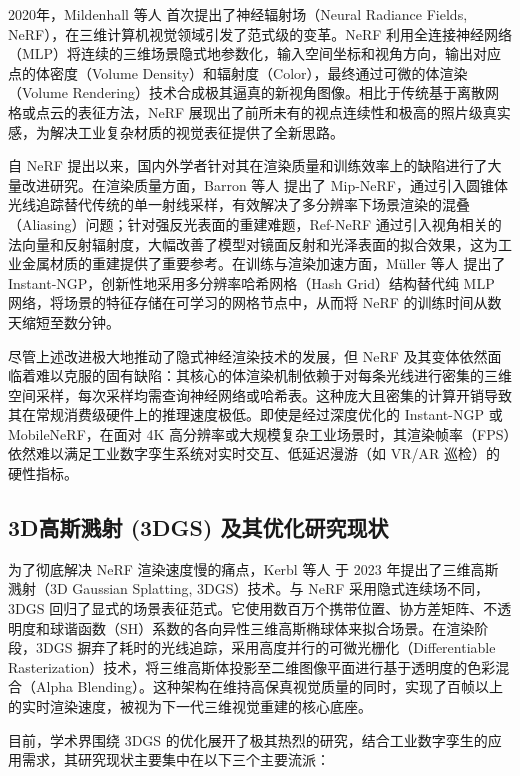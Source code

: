 2020年，Mildenhall 等人\cite{mildenhall2020nerf} 首次提出了神经辐射场（Neural Radiance Fields, NeRF），在三维计算机视觉领域引发了范式级的变革。NeRF 利用全连接神经网络（MLP）将连续的三维场景隐式地参数化，输入空间坐标和视角方向，输出对应点的体密度（Volume Density）和辐射度（Color），最终通过可微的体渲染（Volume Rendering）技术合成极其逼真的新视角图像。相比于传统基于离散网格或点云的表征方法，NeRF 展现出了前所未有的视点连续性和极高的照片级真实感，为解决工业复杂材质的视觉表征提供了全新思路。

自 NeRF 提出以来，国内外学者针对其在渲染质量和训练效率上的缺陷进行了大量改进研究。在渲染质量方面，Barron 等人\cite{barron2021mipnerf} 提出了 Mip-NeRF，通过引入圆锥体光线追踪替代传统的单一射线采样，有效解决了多分辨率下场景渲染的混叠（Aliasing）问题；针对强反光表面的重建难题，Ref-NeRF\cite{verbin2022refnerf} 通过引入视角相关的法向量和反射辐射度，大幅改善了模型对镜面反射和光泽表面的拟合效果，这为工业金属材质的重建提供了重要参考。在训练与渲染加速方面，Müller 等人\cite{muller2022instant} 提出了 Instant-NGP，创新性地采用多分辨率哈希网格（Hash Grid）结构替代纯 MLP 网络，将场景的特征存储在可学习的网格节点中，从而将 NeRF 的训练时间从数天缩短至数分钟。

尽管上述改进极大地推动了隐式神经渲染技术的发展，但 NeRF 及其变体依然面临着难以克服的固有缺陷：其核心的体渲染机制依赖于对每条光线进行密集的三维空间采样，每次采样均需查询神经网络或哈希表。这种庞大且密集的计算开销导致其在常规消费级硬件上的推理速度极低。即使是经过深度优化的 Instant-NGP 或 MobileNeRF\cite{chen2023mobilenerf}，在面对 4K 高分辨率或大规模复杂工业场景时，其渲染帧率（FPS）依然难以满足工业数字孪生系统对实时交互、低延迟漫游（如 VR/AR 巡检）的硬性指标。

\subsection{3D高斯溅射 (3DGS) 及其优化研究现状}

为了彻底解决 NeRF 渲染速度慢的痛点，Kerbl 等人\cite{kerbl20233d} 于 2023 年提出了三维高斯溅射（3D Gaussian Splatting, 3DGS）技术。与 NeRF 采用隐式连续场不同，3DGS 回归了显式的场景表征范式。它使用数百万个携带位置、协方差矩阵、不透明度和球谐函数（SH）系数的各向异性三维高斯椭球体来拟合场景。在渲染阶段，3DGS 摒弃了耗时的光线追踪，采用高度并行的可微光栅化（Differentiable Rasterization）技术，将三维高斯体投影至二维图像平面进行基于透明度的色彩混合（Alpha Blending）。这种架构在维持高保真视觉质量的同时，实现了百帧以上的实时渲染速度，被视为下一代三维视觉重建的核心底座。

目前，学术界围绕 3DGS 的优化展开了极其热烈的研究，结合工业数字孪生的应用需求，其研究现状主要集中在以下三个主要流派：

